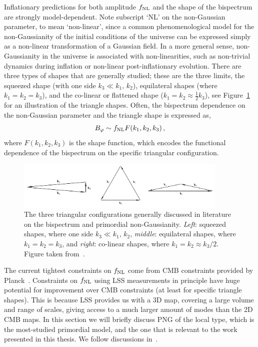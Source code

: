 Inflationary predictions for both amplitude $f_\text{NL}$ and the shape of the bispectrum are strongly model-dependent. Note subscript `NL' on the non-Gaussian parameter, to mean `non-linear', since a common phenomenological model for the non-Gaussianity of the initial conditions of the universe can be expressed simply as a non-linear transformation of a Gaussian field. In a more general sense, non-Gaussianity in the universe is associated with non-linearities, such as non-trivial dynamics during inflation or non-linear post-inflationary evolution. There are three types of shapes that are generally studied; these are the three limits, the squeezed shape (with one side $k_3 \ll k_1,\,k_2$), equilateral shapes (where $k_1 = k_2 = k_3$), and the co-linear or flattened shape ($k_1 = k_2 \approx \frac{1}{2} k_3$), see Figure~\ref{fig:triangleshapes} for an illustration of the triangle shapes. Often, the bispectrum dependence on the non-Gaussian parameter and the triangle shape is expressed as, 
\begin{equation}
	B_\varphi \sim f_\text{NL} F(k_1,k_2,k_3)\,,
\end{equation}
where $F(k_1,k_2,k_3)$ is the shape function, which encodes the functional dependence of the bispectrum on the specific triangular configuration. 

\begin{figure}[!ht]
	\includegraphics[width=0.9\textwidth]{fig/triangleshapes.png}
	\caption{The three triangular configurations generally discussed in literature on the bispectrum and primordial non-Gaussianity. \emph{Left}: squeezed shapes, where one side $k_3 \ll k_1,\,k_2$, \emph{middle}: equilateral shapes, where $k_1 = k_2 = k_3$, and \emph{right}: co-linear shapes, where $k_1 = k_2 \approx k_3/2$. Figure taken from~\cite{Liguori:2010hx}.}\label{fig:triangleshapes}
\end{figure}

The current tightest constraints on $f_\text{NL}$ come from CMB constraints provided by Planck~\cite{Planck:2019kim}. Constraints on $f_\text{NL}$ using LSS measurements in principle have huge potential for improvement over CMB constraints (at least for specific triangle shapes). This is because LSS provides us with a 3D map, covering a large volume and range of scales, giving access to a much larger amount of modes than the 2D CMB maps. In this section we will briefly discuss PNG of the local type, which is the most-studied primordial model, and the one that is relevant to the work presented in this thesis. We follow discussions in~\cite{Liguori:2010hx,Fergusson:2008ra}.

